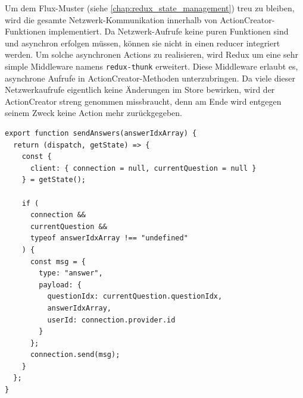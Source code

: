 Um dem Flux-Muster (siehe \ref{chap:redux_state_management}) treu zu bleiben, wird die gesamte Netzwerk-Kommunikation innerhalb von ActionCreator-Funktionen implementiert. Da Netzwerk-Aufrufe keine puren Funktionen sind und asynchron erfolgen müssen, können sie nicht in einen reducer integriert werden. Um solche asynchronen Actions zu realisieren, wird Redux um eine sehr simple Middleware namens \texttt{redux-thunk}\cite{web:redux_thunk} erweitert. Diese Middleware erlaubt es, asynchrone Aufrufe in ActionCreator-Methoden unterzubringen. Da viele dieser Netzwerkaufrufe eigentlich keine Änderungen im Store bewirken, wird der ActionCreator streng genommen missbraucht, denn am Ende wird entgegen seinem Zweck keine Action mehr zurückgegeben.

\begin{minipage}{\linewidth}
\begin{lstlisting}[caption={ActionCreator zum Versenden von Antworten vom Client zum Server. (aus: src/client/actions/client.js)}]
export function sendAnswers(answerIdxArray) {
  return (dispatch, getState) => {
    const {
      client: { connection = null, currentQuestion = null }
    } = getState();

    if (
      connection &&
      currentQuestion &&
      typeof answerIdxArray !== "undefined"
    ) {
      const msg = {
        type: "answer",
        payload: {
          questionIdx: currentQuestion.questionIdx,
          answerIdxArray,
          userId: connection.provider.id
        }
      };
      connection.send(msg);
    }
  };
}
\end{lstlisting}
\end{minipage}